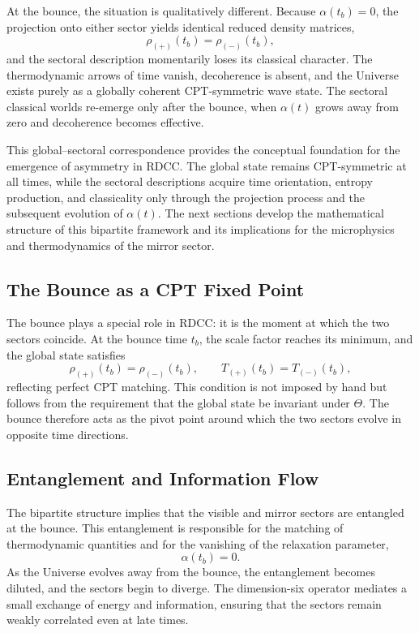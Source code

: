 \documentclass[11pt,a4paper]{article}
\begin{document}
At the bounce, the situation is qualitatively different. Because $\alpha(t_b)=0$, the projection
onto either sector yields identical reduced density matrices,
\begin{equation}
    \rho_{(+)}(t_b) = \rho_{(-)}(t_b),
\end{equation}
and the sectoral description momentarily loses its classical character. The thermodynamic arrows
of time vanish, decoherence is absent, and the Universe exists purely as a globally coherent
CPT-symmetric wave state. The sectoral classical worlds re-emerge only after the bounce, when
$\alpha(t)$ grows away from zero and decoherence becomes effective.

This global–sectoral correspondence provides the conceptual foundation for the emergence of
asymmetry in RDCC. The global state remains CPT-symmetric at all times, while the sectoral
descriptions acquire time orientation, entropy production, and classicality only through the
projection process and the subsequent evolution of $\alpha(t)$. The next sections develop the
mathematical structure of this bipartite framework and its implications for the microphysics and
thermodynamics of the mirror sector.


\subsection{The Bounce as a CPT Fixed Point}

The bounce plays a special role in RDCC: it is the moment at which the two sectors coincide. At the bounce time $t_b$, the scale factor reaches its minimum, and the global state satisfies
\begin{equation}
    \rho_{(+)}(t_b) = \rho_{(-)}(t_b), \qquad
    T_{(+)}(t_b) = T_{(-)}(t_b),
\end{equation}
reflecting perfect CPT matching. This condition is not imposed by hand but follows from the requirement that the global state be invariant under $\Theta$. The bounce therefore acts as the pivot point around which the two sectors evolve in opposite time directions.

\subsection{Entanglement and Information Flow}

The bipartite structure implies that the visible and mirror sectors are entangled at the bounce. This entanglement is responsible for the matching of thermodynamic quantities and for the vanishing of the relaxation parameter,
\begin{equation}
    \alpha(t_b) = 0.
\end{equation}
As the Universe evolves away from the bounce, the entanglement becomes diluted, and the sectors begin to diverge. The dimension-six operator mediates a small exchange of energy and information, ensuring that the sectors remain weakly correlated even at late times.
\end{document}
